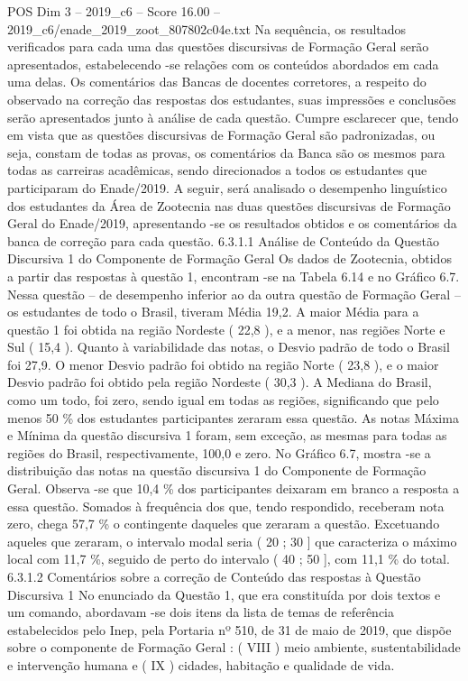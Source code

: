\begin{textsample}{POS Dim 3 – 2019\_c6 – Score 16.00 – 2019\_c6/enade\_2019\_zoot\_807802c04e.txt}
Na sequência, os resultados verificados para cada uma das questões discursivas de Formação Geral serão apresentados, estabelecendo -se relações com os conteúdos abordados em cada uma delas.
Os comentários das Bancas de docentes corretores, a respeito do observado na correção das respostas dos estudantes, suas impressões e conclusões serão apresentados junto à análise de cada questão.
Cumpre esclarecer que, tendo em vista que as questões discursivas de Formação Geral são padronizadas, ou seja, constam de todas as provas, os comentários da Banca são os mesmos para todas as carreiras acadêmicas, sendo direcionados a todos os estudantes que participaram do Enade/2019.
A seguir, será analisado o desempenho linguístico dos estudantes da Área de Zootecnia nas duas questões discursivas de Formação Geral do Enade/2019, apresentando -se os resultados obtidos e os comentários da banca de correção para cada questão. 6.3.1.1 Análise de Conteúdo da Questão Discursiva 1 do Componente de Formação Geral Os dados de Zootecnia, obtidos a partir das respostas à questão 1, encontram -se na Tabela 6.14 e no Gráfico 6.7.
Nessa questão – de desempenho inferior ao da outra questão de Formação Geral – os estudantes de todo o Brasil, tiveram Média 19,2.
A maior Média para a questão 1 foi obtida na região Nordeste ( 22,8 ), e a menor, nas regiões Norte e Sul ( 15,4 ).
Quanto à variabilidade das notas, o Desvio padrão de todo o Brasil foi 27,9.
O menor Desvio padrão foi obtido na região Norte ( 23,8 ), e o maior Desvio padrão foi obtido pela região Nordeste ( 30,3 ).
A Mediana do Brasil, como um todo, foi zero, sendo igual em todas as regiões, significando que pelo menos 50 \% dos estudantes participantes zeraram essa questão.
As notas Máxima e Mínima da questão discursiva 1 foram, sem exceção, as mesmas para todas as regiões do Brasil, respectivamente, 100,0 e zero.
No Gráfico 6.7, mostra -se a distribuição das notas na questão discursiva 1 do Componente de Formação Geral.
Observa -se que 10,4 \% dos participantes deixaram em branco a resposta a essa questão.
Somados à frequência dos que, tendo respondido, receberam nota zero, chega 57,7 \% o contingente daqueles que zeraram a questão.
Excetuando aqueles que zeraram, o intervalo modal seria ( 20 ; 30 ] que caracteriza o máximo local com 11,7 \%, seguido de perto do intervalo ( 40 ; 50 ], com 11,1 \% do total. 6.3.1.2 Comentários sobre a correção de Conteúdo das respostas à Questão Discursiva 1 No enunciado da Questão 1, que era constituída por dois textos e um comando, abordavam -se dois itens da lista de temas de referência estabelecidos pelo Inep, pela Portaria nº 510, de 31 de maio de 2019, que dispõe sobre o componente de Formação Geral : ( VIII ) meio ambiente, sustentabilidade e intervenção humana e ( IX ) cidades, habitação e qualidade de vida.

\end{textsample}
